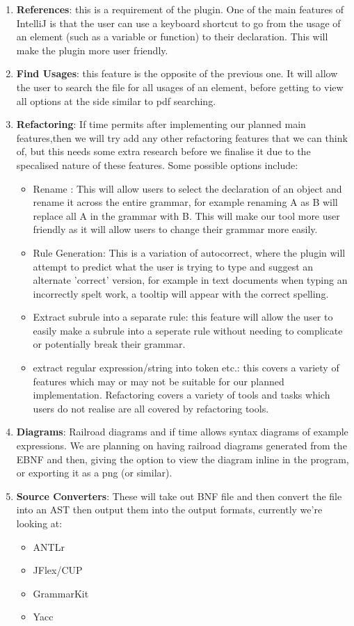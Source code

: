 \documentclass{l3proj}
\begin{document}
\begin{enumerate}
	\item \textbf{References}: this is a requirement of the plugin. One of the main features of IntelliJ is that the user can use a keyboard shortcut to go from the usage of an element (such as a variable or function) to their declaration. This will make the plugin more user friendly.
	\item \textbf{Find Usages}: this feature is the opposite of the previous one. It will allow the user to search the file for all usages of an element, before getting to view all options at the side similar to pdf searching.
	\item \textbf{Refactoring}: If time permits after implementing our planned main features,then we will try add any other refactoring features that we can think of, but this needs some extra research before we finalise it due to the specalised nature of these features. Some possible options include:
	      \begin{itemize}
		    \item Rename : This will allow users to select the declaration of an object and rename it across the entire grammar, for example renaming A as B will replace all A in the grammar with B. This will make our tool more user friendly as it will allow users to change their grammar more easily. 
		    \item Rule Generation: This is a variation of autocorrect, where the plugin will attempt to predict what the user is trying to type and suggest an alternate 'correct' version, for example in text documents when typing an incorrectly spelt work, a tooltip will appear with the correct spelling.
		    \item Extract subrule into a separate rule: this feature will allow the user to easily make a subrule into a seperate rule without needing to complicate or potentially break their grammar. 
		    \item extract regular expression/string into token etc.: this covers a variety of features which may or may not be suitable for our planned implementation. Refactoring covers a variety of tools and tasks which users do not realise are all covered by refactoring tools.
	      \end{itemize}
	\item \textbf{Diagrams}: Railroad diagrams and if time allows syntax diagrams of example expressions. We are planning on having railroad diagrams generated from the EBNF and then, giving the option to view the diagram inline in the program, or exporting it as a png (or similar). 
	\item \textbf{Source Converters}: These will take out BNF file and then convert the file into an AST then output them into the output formats, currently we're looking at:
	      \begin{itemize}
		    \item ANTLr
		    \item JFlex/CUP
		    \item GrammarKit
		    \item Yacc
	      \end{itemize}
	      

\end{enumerate}
\end{document}
